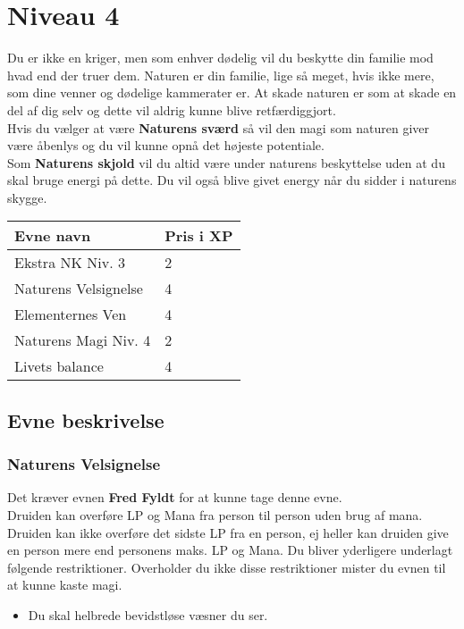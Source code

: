 \chapter{Niveau 4}
Du er ikke en kriger, men som enhver dødelig vil du beskytte din familie mod hvad end der truer dem. Naturen er din familie, lige så meget, hvis ikke mere, som dine venner og dødelige kammerater er. At skade naturen er som at skade en del af dig selv og dette vil aldrig kunne blive retfærdiggjort.\\
Hvis du vælger at være \textbf{Naturens sværd} så vil den magi som naturen giver være åbenlys og du vil kunne opnå det højeste potentiale.\\
Som \textbf{Naturens skjold} vil du altid være under naturens beskyttelse uden at du skal bruge energi på dette. Du vil også blive givet energy når du sidder i naturens skygge.\\

\begin{table}[H]
    \centering
    \begin{tabular}{|p{}|p{}|}
    \rowcolor{cerulean!80}\hline
        Evne navn & Pris i XP \\\hline
        Ekstra NK Niv. 3 & 2\\\hline
        Naturens Velsignelse & 4\\\hline
        Elementernes Ven & 4 \\\hline
        Naturens Magi Niv. 4 & 2 \\\hline
        Livets balance &4\\\hline
    \end{tabular}
\end{table}
\section{Evne beskrivelse}



\subsection{Naturens Velsignelse}
Det kræver evnen \textbf{Fred Fyldt} for at kunne tage denne evne.\\
Druiden kan overføre LP og Mana fra person til person uden brug af mana.
Druiden kan ikke overføre det sidste LP fra en person, ej heller kan druiden give
en person mere end personens maks. LP og Mana.
Du bliver yderligere underlagt følgende restriktioner. Overholder du ikke disse restriktioner mister du evnen til at kunne kaste magi.
\begin{itemize}
    \item Du skal helbrede bevidstløse væsner du ser.
\end{itemize}

